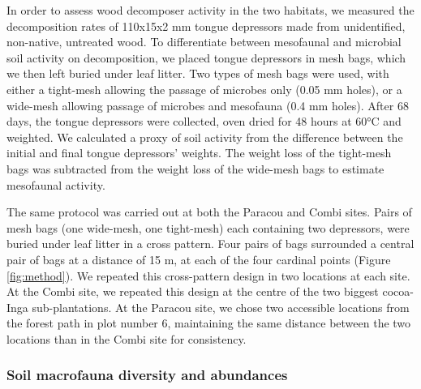 \documentclass[fleqn,10pt]{ArtEcoFoG} %
\begin{document}
In order to assess wood decomposer activity in the two habitats, we measured the decomposition rates of 110x15x2 mm tongue depressors made from unidentified, non-native, untreated wood. To differentiate between mesofaunal and microbial soil activity on decomposition, we placed tongue depressors in mesh bags, which we then left buried under leaf litter. Two types of mesh bags were used, with either a tight-mesh allowing the passage of microbes only (0.05 mm holes), or a wide-mesh allowing passage of microbes and mesofauna (0.4 mm holes). After 68 days, the tongue depressors were collected, oven dried for 48 hours at 60°C and weighted. We calculated a proxy of soil activity from the difference between the initial and final tongue depressors' weights. The weight loss of the tight-mesh bags was subtracted from the weight loss of the wide-mesh bags to estimate mesofaunal activity.

The same protocol was carried out at both the Paracou and Combi sites. Pairs of mesh bags (one wide-mesh, one tight-mesh) each containing two depressors, were buried under leaf litter in a cross pattern. Four pairs of bags surrounded a central pair of bags at a distance of 15 m, at each of the four cardinal points (Figure \ref{fig:method}). We repeated this cross-pattern design in two locations at each site. At the Combi site, we repeated this design at the centre of the two biggest cocoa-Inga sub-plantations. At the Paracou site, we chose two accessible locations from the forest path in plot number 6, maintaining the same distance between the two locations than in the Combi site for consistency.

\subsubsection{Soil macrofauna diversity and abundances}\label{soil-macrofauna-diversity-and-abundances}

\scriptsize
\end{document}
